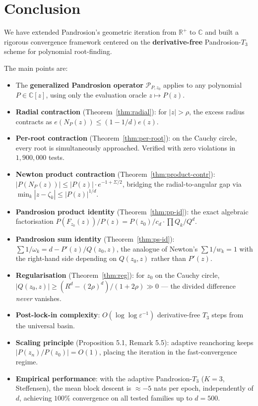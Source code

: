 \documentclass[11pt,a4paper]{article}
\begin{document}
\section{Conclusion}

We have extended Pandrosion's geometric iteration from $\mathbb{R}^+$ to $\mathbb{C}$ and built a rigorous convergence framework centered on the \textbf{derivative-free} Pandrosion-$T_3$ scheme for polynomial root-finding.

The main points are:
\begin{itemize}
\item The \textbf{generalized Pandrosion operator} $\mathcal{P}_{P, z_0}$ applies to any polynomial $P \in \mathbb{C}[z]$, using only the evaluation oracle $z \mapsto P(z)$.
\item \textbf{Radial contraction} (Theorem~\ref{thm:radial}): for $|z| > \rho$, the excess radius contracts as $e(N_P(z)) \le (1 - 1/d) e(z)$.
\item \textbf{Per-root contraction} (Theorem~\ref{thm:per-root}): on the Cauchy circle, every root is simultaneously approached. Verified with zero violations in $1{,}900{,}000$ tests.
\item \textbf{Newton product contraction} (Theorem~\ref{thm:product-contr}): $|P(N_P(z))| \le |P(z)| \cdot e^{-1 + \Sigma/2}$, bridging the radial-to-angular gap via $\min_k |z - \zeta_k| \le |P(z)|^{1/d}$.
\item \textbf{Pandrosion product identity} (Theorem~\ref{thm:pp-id}): the exact algebraic factorisation $P(F_{z_0}(z))/P(z) = P(z_0)/c_d \cdot \prod Q_k/Q^d$.
\item \textbf{Pandrosion sum identity} (Theorem~\ref{thm:ps-id}): $\sum 1/\omega_k = d - P'(z)/Q(z_0, z)$, the analogue of Newton's $\sum 1/w_k = 1$ with the right-hand side depending on $Q(z_0, z)$ rather than $P'(z)$.
\item \textbf{Regularisation} (Theorem~\ref{thm:reg}): for $z_0$ on the Cauchy circle, $|Q(z_0, z)| \ge (R^d - (2\rho)^d)/(1 + 2\rho) \gg 0$ --- the divided difference \emph{never} vanishes.
\item \textbf{Post-lock-in complexity}: $O(\log\log \varepsilon^{-1})$ derivative-free $T_3$ steps from the universal basin.
\item \textbf{Scaling principle} (Proposition 5.1, Remark 5.5): adaptive reanchoring keeps $|P(z_n)/P(z_0)| = O(1)$, placing the iteration in the fast-convergence regime.
\item \textbf{Empirical performance}: with the adaptive Pandrosion-$T_3$ ($K = 3$, Steffensen), the mean block descent is $\approx -5$ nats per epoch, independently of $d$, achieving $100\%$ convergence on all tested families up to $d = 500$.
\end{itemize}
\end{document}

